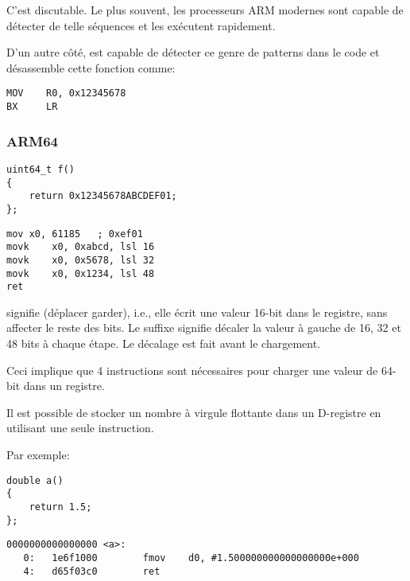 C'est discutable. Le plus souvent, les processeurs ARM modernes sont capable de détecter
de telle séquences et les exécutent rapidement.

D'un autre côté, \IDA est capable de détecter ce genre de patterns dans le code et
désassemble cette fonction comme:

\begin{lstlisting}[style=customasmARM]
MOV    R0, 0x12345678
BX     LR
\end{lstlisting}

\subsubsection{ARM64}

\begin{lstlisting}[style=customc]
uint64_t f()
{
	return 0x12345678ABCDEF01;
};
\end{lstlisting}

\begin{lstlisting}[caption=GCC 4.9.1 -O3,style=customasmARM]
mov	x0, 61185   ; 0xef01
movk	x0, 0xabcd, lsl 16
movk	x0, 0x5678, lsl 32
movk	x0, 0x1234, lsl 48
ret
\end{lstlisting}

 signifie  (déplacer garder), i.e., elle écrit une valeur
16-bit dans le registre, sans affecter le reste des bits.
Le suffixe  signifie décaler la valeur à gauche de 16, 32 et 48 bits à chaque
étape. Le décalage est fait avant le chargement.

Ceci implique que 4 instructions sont nécessaires pour charger une valeur de 64-bit
dans un registre.


Il est possible de stocker un nombre à virgule flottante dans un D-registre en utilisant
une seule instruction.

Par exemple:

\begin{lstlisting}[style=customc]
double a()
{
	return 1.5;
};
\end{lstlisting}

\begin{lstlisting}[caption=GCC 4.9.1 -O3 + objdump,style=customasmARM]
0000000000000000 <a>:
   0:   1e6f1000        fmov    d0, #1.500000000000000000e+000
   4:   d65f03c0        ret
\end{lstlisting}

